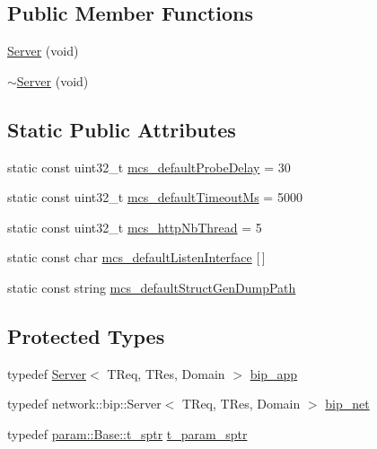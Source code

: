 \subsection*{Public Member Functions}
\begin{DoxyCompactItemize}
\item 
\hyperlink{classxtd_1_1servers_1_1app_1_1Server_ac30046979fc32ad42c2436c0f3854ea2}{Server} (void)
\item 
\hyperlink{classxtd_1_1servers_1_1app_1_1Server_a1b30c4e9066d130569acb7d31c125e20}{$\sim$\+Server} (void)
\end{DoxyCompactItemize}
\subsection*{Static Public Attributes}
\begin{DoxyCompactItemize}
\item 
static const uint32\+\_\+t \hyperlink{classxtd_1_1servers_1_1app_1_1Server_ae361d389bf6050e2565055e7e3800e82}{mcs\+\_\+default\+Probe\+Delay} = 30
\item 
static const uint32\+\_\+t \hyperlink{classxtd_1_1servers_1_1app_1_1Server_a76f9b8224a5555f638527752e26d5457}{mcs\+\_\+default\+Timeout\+Ms} = 5000
\item 
static const uint32\+\_\+t \hyperlink{classxtd_1_1servers_1_1app_1_1Server_ac9944d61cb7fd45d86c1128e1ac55670}{mcs\+\_\+http\+Nb\+Thread} = 5
\item 
static const char \hyperlink{classxtd_1_1servers_1_1app_1_1Server_a9d3ac8218bf47d8ffa6d8b30a6195fa8}{mcs\+\_\+default\+Listen\+Interface} \mbox{[}$\,$\mbox{]}
\item 
static const string \hyperlink{classxtd_1_1servers_1_1app_1_1Server_afae8d71c231f3e48ec8270217fddae10}{mcs\+\_\+default\+Struct\+Gen\+Dump\+Path}
\end{DoxyCompactItemize}
\subsection*{Protected Types}
\begin{DoxyCompactItemize}
\item 
typedef \hyperlink{classxtd_1_1servers_1_1app_1_1Server}{Server}$<$ T\+Req, T\+Res, Domain $>$ \hyperlink{classxtd_1_1servers_1_1app_1_1Server_a6159422bbffe0fd3d02eb21c4e61011e}{bip\+\_\+app}
\item 
typedef network\+::bip\+::\+Server$<$ T\+Req, T\+Res, Domain $>$ \hyperlink{classxtd_1_1servers_1_1app_1_1Server_a7254e9a899be59bbe8ea13ca127108dc}{bip\+\_\+net}
\item 
typedef \hyperlink{classxtd_1_1servers_1_1param_1_1Base_aaf4d92eca642f61cb81524096926c6a1}{param\+::\+Base\+::t\+\_\+sptr} \hyperlink{classxtd_1_1servers_1_1app_1_1Server_a72a3c0bea3f2fc2e87b98e09e54fc9ac}{t\+\_\+param\+\_\+sptr}
\end{DoxyCompactItemize}
